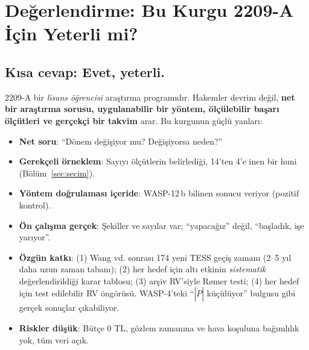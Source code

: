 \section{Değerlendirme: Bu Kurgu 2209-A İçin Yeterli mi?}
\label{sec:degerlendirme}

\subsection{Kısa cevap: Evet, yeterli.}
2209-A bir \emph{lisans öğrencisi} araştırma programıdır. Hakemler devrim değil, \textbf{net bir araştırma sorusu,
uygulanabilir bir yöntem, ölçülebilir başarı ölçütleri ve gerçekçi bir takvim} arar. Bu kurgunun güçlü yanları:
\begin{itemize}[leftmargin=*]
\item \textbf{Net soru}: “Dönem değişiyor mu? Değişiyorsa neden?”
\item \textbf{Gerekçeli örneklem}: Sayıyı ölçütlerin belirlediği, 14'ten 4'e inen bir huni (Bölüm~\ref{sec:secim}).
\item \textbf{Yöntem doğrulaması içeride}: WASP-12\,b bilinen sonucu veriyor (pozitif kontrol).
\item \textbf{Ön çalışma gerçek}: Şekiller ve sayılar var; “yapacağız” değil, “başladık, işe yarıyor”.
\item \textbf{Özgün katkı}: (1) Wang vd. sonrası 174 yeni TESS geçiş zamanı (2–5 yıl daha uzun zaman tabanı);
      (2) her hedef için altı etkinin \emph{sistematik} değerlendirildiği karar tablosu; (3) arşiv RV'siyle Rømer testi;
      (4) her hedef için test edilebilir RV öngörüsü. WASP-4'teki “$|\dot P|$ küçülüyor” bulgusu gibi gerçek sonuçlar
      çıkabiliyor.
\item \textbf{Riskler düşük}: Bütçe 0 TL, gözlem zamanına ve hava koşuluna bağımlılık yok, tüm veri açık.
\end{itemize}

